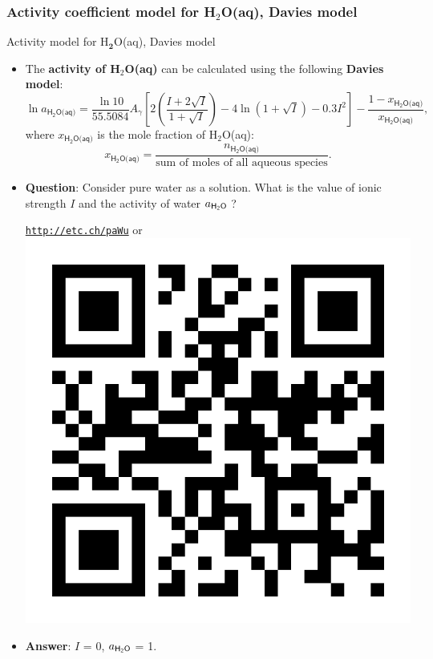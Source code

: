 \subsubsection{Activity coefficient model for H$_2$O(aq), Davies model}
%
%
\begin{frame}{Activity model for H$_{\boldsymbol{2}}$O(aq), Davies model}
\begin{itemize}
\item The \textbf{activity of H$_{2}$O(aq)} can be calculated
using the following \alert{\textbf{Davies model}}:
\[
\boxed{\ln a_{\mathsf{H_{2}O\text{(aq)}}}=\frac{\ln10}{55.5084}A_{\gamma}\left[2\left(\frac{I+2\sqrt{I}}{1+\sqrt{I}}\right)-4\ln(1+\sqrt{I})-0.3I^{2}\right]-\frac{1-x_{\mathsf{\mathsf{H_{2}O\text{(aq)}}}}}{x_{\mathsf{\mathsf{H_{2}O\text{(aq)}}}}}},
\]
where $x_{\mathsf{H_{2}O\text{(aq)}}}$ is the mole fraction of H$_{2}$O(aq):{\small{}
\[
x_{\mathsf{H_{2}O\text{(aq)}}}=\frac{n_{\mathsf{H_{2}O\text{(aq)}}}}{\text{sum of moles of all aqueous species}}.
\]
}{\small\par}
\pause
\item \alert{\textbf{Question}}: Consider pure water as a solution.
What is the value of ionic strength $I$ and the activity of water $a_{\sf H_2O}$ ?  
\begin{center}
	\href{http://etc.ch/paWu}{\textcolor{indigo(dye)}{\tt http://etc.ch/paWu}} \quad or \quad 
	\includegraphics[height=0.1\columnwidth]{figures/activity-models/poll-ionic-strength.png}
\end{center}
\hiddenpause
\item \textbf{Answer}: $I$ = 0, $a_{\sf H_2O}$ = 1.
\end{itemize}
\end{frame}
%
%
